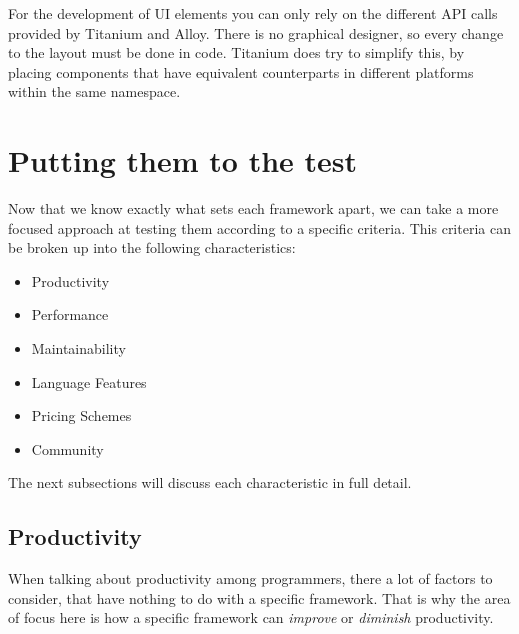 For the development of \ac{UI} elements you can only rely on the different \ac{API} calls provided by Titanium and Alloy. There is no graphical designer, so every change to the layout must be done in code. Titanium does try to simplify this, by placing components that have equivalent counterparts in different platforms within the same namespace.   



\section{Putting them to the test}
Now that we know exactly what sets each framework apart, we can take a more focused approach at testing them according to a specific criteria. This criteria can be broken up into the following characteristics:

\begin{itemize}
\item Productivity
\item Performance
\item Maintainability
\item Language Features
\item Pricing Schemes
\item Community
\end{itemize}
The next subsections will discuss each characteristic in full detail.

\subsection{Productivity}%
When talking about productivity among programmers, there a lot of factors to consider, that have nothing to do with a specific framework. That is why the area of focus here is how a specific framework can \textit{improve} or \textit{diminish} productivity.

